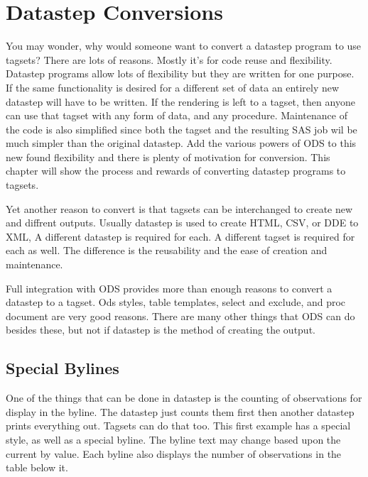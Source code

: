 \chapter{Datastep Conversions}
You may wonder, why would someone want to convert a datastep 
program to use tagsets?  There are lots of reasons.  Mostly it's
for code reuse and flexibility.  Datastep programs allow lots of
flexibility but they are written for one purpose.  If the same 
functionality is desired for a different set of data an entirely
new datastep will have to be written.  If the rendering is left to
a tagset, then anyone can use that tagset with any form of data,
and any procedure.  Maintenance of the code is also simplified 
since both the tagset and the resulting SAS job wil be much
simpler than the original datastep. Add the various powers of
ODS to this new found flexibility and there is plenty of motivation
for conversion.  This chapter will show the process and rewards 
of converting datastep programs to tagsets. 

Yet another reason to
convert is that tagsets can be interchanged to create new and 
diffrent outputs.  Usually datastep is used to create HTML, CSV,
or DDE to XML,  A different datastep is required for each.  A different
tagset is required for each as well.  The difference is the reusability
and the ease of creation and maintenance.

Full integration with ODS provides more than enough reasons to convert 
a datastep to a tagset.  Ods styles, table templates, select and exclude,
and proc document are very good reasons.  There are many other things that
ODS can do besides these, but not if datastep is the method of creating the
output.

\section{Special Bylines}
One of the things that can be done in datastep is the counting of observations
for display in the byline.  The datastep just counts them first then another
datastep prints everything out.  Tagsets can do that too.  This first example
has a special style, as well as a special byline.  The byline text may change
based upon the current by value.  Each byline also displays the number of
observations in the table below it.  


